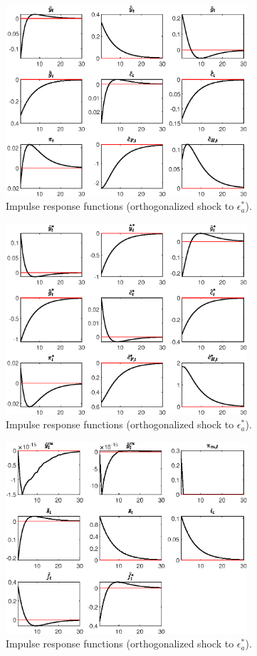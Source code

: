  
\begin{figure}[H]
\centering 
\includegraphics[width=0.80\textwidth]{Model_MAIN_2/graphs/Model_MAIN_2_IRF_eps_a_starr1}
\caption{Impulse response functions (orthogonalized shock to ${\epsilon_a^*}$).}\label{Fig:IRF:eps_a_starr:1}
\end{figure}
 
\begin{figure}[H]
\centering 
\includegraphics[width=0.80\textwidth]{Model_MAIN_2/graphs/Model_MAIN_2_IRF_eps_a_starr2}
\caption{Impulse response functions (orthogonalized shock to ${\epsilon_a^*}$).}\label{Fig:IRF:eps_a_starr:2}
\end{figure}
 
\begin{figure}[H]
\centering 
\includegraphics[width=0.80\textwidth]{Model_MAIN_2/graphs/Model_MAIN_2_IRF_eps_a_starr3}
\caption{Impulse response functions (orthogonalized shock to ${\epsilon_a^*}$).}\label{Fig:IRF:eps_a_starr:3}
\end{figure}
 
 
